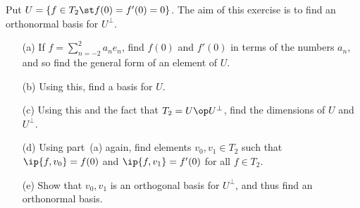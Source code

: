 \begin{exercise}
 Put $U=\{f\in T_2\st f(0)=f'(0)=0\}$.  The aim of this exercise is to
 find an orthonormal basis for $U^\perp$.
 \begin{itemize}
  \item[(a)] If $f=\sum_{n=-2}^2a_ne_n$, find $f(0)$ and $f'(0)$ in
   terms of the numbers $a_n$, and so find the general form of an
   element of $U$.
  \item[(b)] Using this, find a basis for $U$.
  \item[(c)] Using this and the fact that $T_2=U\op U^\perp$, find the
   dimensions of $U$ and $U^\perp$.
  \item[(d)] Using part~(a) again, find elements $v_0,v_1\in T_2$ such
   that $\ip{f,v_0}=f(0)$ and $\ip{f,v_1}=f'(0)$ for all $f\in T_2$. 
  \item[(e)] Show that $v_0,v_1$ is an orthogonal basis for $U^\perp$,
   and thus find an orthonormal basis.
 \end{itemize}
\end{exercise}
